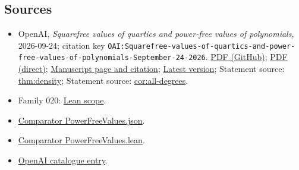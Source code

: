 \documentclass[11pt]{article}
\begin{document}
\subsection{Sources}
\begin{itemize}
\item OpenAI, \emph{Squarefree values of quartics and power-free values of polynomials}, 2026-09-24; citation key \texttt{OAI:Squarefree-values-of-quartics-and-power-free-values-of-polynomials-September-24-2026}. \href{https://github.com/openai/math/blob/adc7f1241b42e322a6451854ab7e4b4c146bf78a/preprints/Squarefree-values-of-quartics-and-power-free-values-of-polynomials-September-24-2026/manuscript.pdf}{PDF (GitHub)}; \href{https://github.com/openai/math/raw/adc7f1241b42e322a6451854ab7e4b4c146bf78a/preprints/Squarefree-values-of-quartics-and-power-free-values-of-polynomials-September-24-2026/manuscript.pdf}{PDF (direct)}; \href{https://github.com/openai/math/blob/adc7f1241b42e322a6451854ab7e4b4c146bf78a/preprints/Squarefree-values-of-quartics-and-power-free-values-of-polynomials-September-24-2026/README.md}{Manuscript page and citation}; \href{https://github.com/openai/math/blob/main/preprints/Squarefree-values-of-quartics-and-power-free-values-of-polynomials-September-24-2026/manuscript.pdf}{Latest version}; Statement source: \href{https://github.com/openai/math/blob/adc7f1241b42e322a6451854ab7e4b4c146bf78a/preprints/Squarefree-values-of-quartics-and-power-free-values-of-polynomials-September-24-2026/build/sections/01-introduction.tex\#L20}{thm:density}; Statement source: \href{https://github.com/openai/math/blob/adc7f1241b42e322a6451854ab7e4b4c146bf78a/preprints/Squarefree-values-of-quartics-and-power-free-values-of-polynomials-September-24-2026/build/sections/01-introduction.tex\#L113}{cor:all-degrees}.
\item Family 020: \href{https://github.com/openai/math/blob/adc7f1241b42e322a6451854ab7e4b4c146bf78a/lean/docs/020.md}{Lean scope}.
\item \href{https://github.com/openai/math/blob/adc7f1241b42e322a6451854ab7e4b4c146bf78a/lean/ComparatorChallenges/PowerFreeValues.json}{Comparator PowerFreeValues.json}.
\item \href{https://github.com/openai/math/blob/adc7f1241b42e322a6451854ab7e4b4c146bf78a/lean/ComparatorChallenges/PowerFreeValues.lean}{Comparator PowerFreeValues.lean}.
\item \href{https://github.com/openai/math/blob/adc7f1241b42e322a6451854ab7e4b4c146bf78a/CONTENTS.md}{OpenAI catalogue entry}.
\end{itemize}
\end{document}
